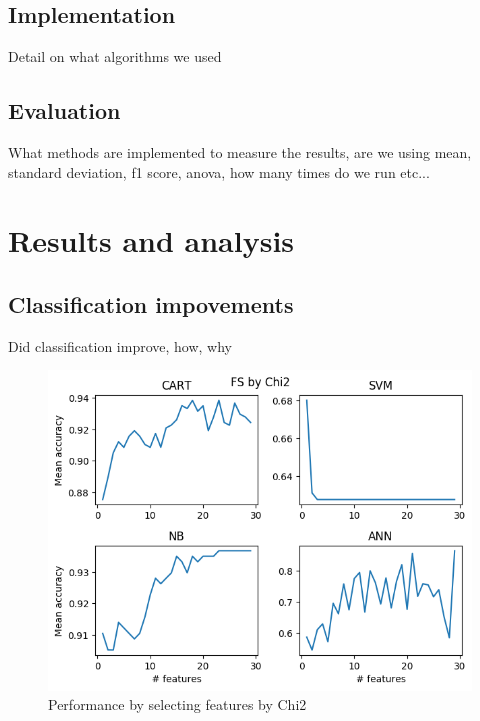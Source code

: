 \documentclass{kththesis}
\begin{document}
\section{Implementation}

Detail on what algorithms we used

\section{Evaluation}

What methods are implemented to measure the results, are we using mean, standard deviation, f1 score, anova, how many times do we run etc...


\chapter{Results and analysis}

\section{Classification impovements}

Did classification improve, how, why

\begin{figure}[ht!]
  \includegraphics[width=\linewidth]{../plots/FS_by_Chi2.png}
  \caption{Performance by selecting features by Chi2}
  \label{fig:chi2}
\end{figure}
\end{document}

